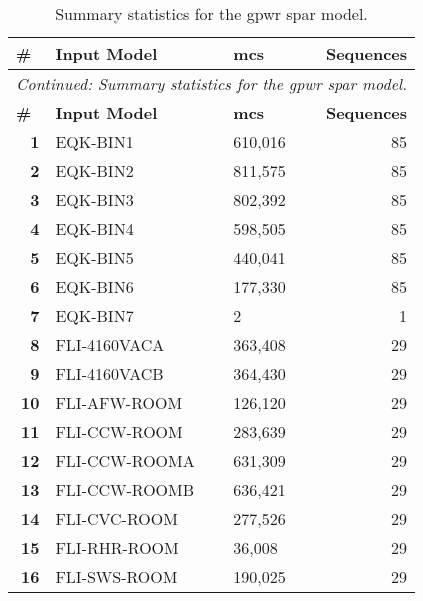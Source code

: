 
\section{\color{blue}{UPDATE WITH PROBABILITIES FROM task4}}
\begin{longtable}{@{}rllr@{}}
\caption{Summary statistics for the \acrlong{gpwr} \acrshort{spar} model.}
\label{tab:generic_pwr_summary}\\
\toprule
\multicolumn{1}{l}{\textbf{\#}} & \textbf{Input Model} & \textbf{\acrlong{mcs}}               & \multicolumn{1}{r}{\textbf{Sequences}} \\* \midrule
\endfirsthead
\multicolumn{4}{c}{\textit{Continued: Summary statistics for the \acrlong{gpwr} \acrshort{spar} model.}}\\
\toprule
\multicolumn{1}{l}{\textbf{\#}} & \textbf{Input Model} & \textbf{\acrlong{mcs}}               & \multicolumn{1}{r}{\textbf{Sequences}} \\* \midrule
\endhead
%
\bottomrule
\endfoot
%
\endlastfoot
%
\textbf{1}  & EQK-BIN1         & 610,016   & 85 \\
\textbf{2}  & EQK-BIN2         & 811,575   & 85 \\
\textbf{3}  & EQK-BIN3         & 802,392   & 85 \\
\textbf{4}  & EQK-BIN4         & 598,505   & 85 \\
\textbf{5}  & EQK-BIN5         & 440,041   & 85 \\
\textbf{6}  & EQK-BIN6         & 177,330   & 85 \\
\textbf{7}  & EQK-BIN7         & 2         & 1  \\
\textbf{8}  & FLI-4160VACA     & 363,408   & 29 \\
\textbf{9}  & FLI-4160VACB     & 364,430   & 29 \\
\textbf{10} & FLI-AFW-ROOM     & 126,120   & 29 \\
\textbf{11} & FLI-CCW-ROOM     & 283,639   & 29 \\
\textbf{12} & FLI-CCW-ROOMA    & 631,309   & 29 \\
\textbf{13} & FLI-CCW-ROOMB    & 636,421   & 29 \\
\textbf{14} & FLI-CVC-ROOM     & 277,526   & 29 \\
\textbf{15} & FLI-RHR-ROOM     & 36,008    & 29 \\
\textbf{16} & FLI-SWS-ROOM     & 190,025   & 29 \\

\end{longtable}
